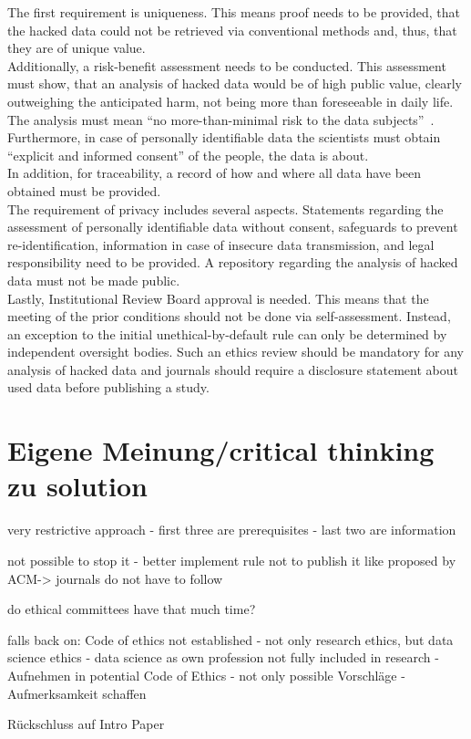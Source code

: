 The first requirement is uniqueness.
This means proof needs to be provided, that the hacked data could not be retrieved via conventional methods and, thus, that they are of unique value.\\
Additionally, a risk-benefit assessment needs to be conducted.
This assessment must show, that an analysis of hacked data would be of high public value, clearly outweighing the anticipated harm, not being more than foreseeable in daily life.
The analysis must mean ``no more-than-minimal risk to the data subjects''~\parencite[][747]{nature}.\\
Furthermore, in case of personally identifiable data the scientists must obtain ``explicit and informed consent'' of the people, the data is about.\\
In addition, for traceability, a record of how and where all data have been obtained must be provided.\\
The requirement of privacy includes several aspects.
Statements regarding the assessment of personally identifiable data without consent, safeguards to prevent re-identification, information in case of insecure data transmission, and legal responsibility need to be provided.
A repository regarding the analysis of hacked data must not be made public.\\
Lastly, Institutional Review Board approval is needed.
This means that the meeting of the prior conditions should not be done via self-assessment.
Instead, an exception to the initial unethical-by-default rule can only be determined by independent oversight bodies.
Such an ethics review should be mandatory for any analysis of hacked data and journals should require a disclosure statement about used data before publishing a study.

\section*{Eigene Meinung/critical thinking zu solution}

very restrictive approach
- first three are prerequisites
- last two are information

not possible to stop it
- better implement rule not to publish it like proposed by ACM-> journals do not have to follow

do ethical committees have that much time?

falls back on:
Code of ethics not established
- not only research ethics, but data science ethics
- data science as own profession not fully included in research
- Aufnehmen in potential Code of Ethics
  - not only possible Vorschläge
- Aufmerksamkeit schaffen


Rückschluss auf Intro Paper
